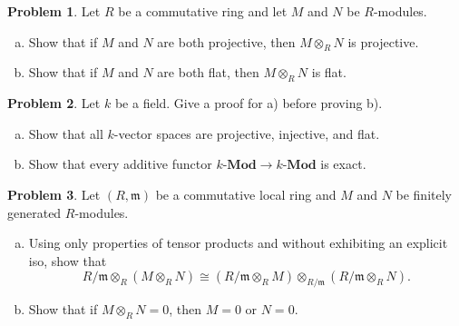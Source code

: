 \documentclass[11pt]{article}
\newcommand{\m}{\mathfrak{m}}
\theoremstyle{definition}
\newtheorem{problem}{Problem}
\begin{document}
\vfill

\begin{problem}
	Let $R$ be a commutative ring and let $M$ and $N$ be $R$-modules.
	
	\begin{enumerate}[a)]
		\item Show that if $M$ and $N$ are both projective, then $M \otimes_R N$ is projective.
		\item Show that if $M$ and $N$ are both flat, then $M \otimes_R N$ is flat.
	\end{enumerate}
\end{problem}



\vfill


\begin{problem}
	Let $k$ be a field. Give a proof for a) before proving b).
	\begin{enumerate}[a)]
		\item Show that all $k$-vector spaces are projective, injective, and flat.
		\item Show that every additive functor $k\textbf{-Mod} \longrightarrow k\textbf{-Mod}$ is exact.
	\end{enumerate}
\end{problem}


\vfill

\begin{problem}
	Let $(R, \m)$ be a commutative local ring and $M$ and $N$ be finitely generated $R$-modules. 
	\begin{enumerate}[a)]
	\item Using only properties of tensor products and without exhibiting an explicit iso, show that
	$$R/\m \otimes_R (M \otimes_R N) \cong (R/\m \otimes_R M) \otimes_{R/\m} (R/\m \otimes_R N).$$
	\item Show that if $M \otimes_R N = 0$, then $M = 0$ or $N = 0$.
	\end{enumerate}
\end{problem}
\end{document}
